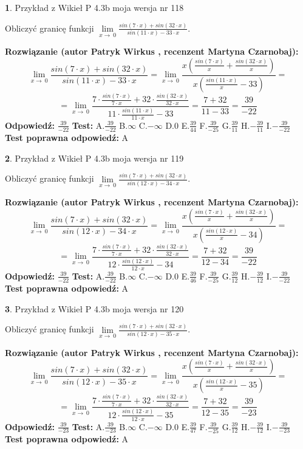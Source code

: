 \documentclass[12pt, a4paper]{article}
\theoremstyle{definition} %
\newtheorem{zad}{}
\newcommand{\zadStart}[1]{\begin{zad}#1\newline}
\newcommand{\zadStop}{\end{zad}}
\newcommand{\rozwStart}[2]{\noindent \textbf{Rozwiązanie (autor #1 , recenzent #2): }\newline}
\newcommand{\rozwStop}{\newline}
\newcommand{\odpStart}{\noindent \textbf{Odpowiedź:}\newline}
\newcommand{\odpStop}{\newline}
\newcommand{\testStart}{\noindent \textbf{Test:}\newline}
\newcommand{\testStop}{\newline}
\newcommand{\kluczStart}{\noindent \textbf{Test poprawna odpowiedź:}\newline}
\newcommand{\kluczStop}{\newline}
\begin{document}
\zadStart{Przykład z Wikieł P 4.3b moja wersja nr 118}


Obliczyć granicę funkcji $\lim\limits_{x\to\ 0}\frac{sin(7 \cdot x)+sin(32 \cdot x)}{sin(11 \cdot x)-33 \cdot x}$.
\zadStop
\rozwStart{Patryk Wirkus}{Martyna Czarnobaj}
$$\lim\limits_{x\to\ 0}\frac{sin(7 \cdot x)+sin(32 \cdot x)}{sin(11 \cdot x)-33 \cdot x}=\lim\limits_{x\to\ 0}\frac{x(\frac{sin(7 \cdot x)}{x}+\frac{sin(32 \cdot x)}{x})}{x(\frac{sin(11 \cdot x)}{x}-33)}=$$
$$=\lim\limits_{x\to\ 0}\frac{7 \cdot \frac{sin(7 \cdot x)}{7 \cdot x}+32 \cdot \frac{sin(32 \cdot x)}{32 \cdot x}}{11 \cdot \frac{sin(11 \cdot x)}{11 \cdot x}-33}=\frac{7+32}{11-33} = \frac{39}{-22}$$
\rozwStop
\odpStart
$\frac{39}{-22}$
\odpStop
\testStart
A.$\frac{39}{-22}$
B.$\infty$
C.$-\infty$
D.$0$
E.$\frac{39}{44}$
F.$\frac{39}{-25}$
G.$\frac{39}{11}$
H.$-\frac{39}{11}$
I.$-\frac{39}{-22}$
\testStop
\kluczStart
A
\kluczStop



\zadStart{Przykład z Wikieł P 4.3b moja wersja nr 119}


Obliczyć granicę funkcji $\lim\limits_{x\to\ 0}\frac{sin(7 \cdot x)+sin(32 \cdot x)}{sin(12 \cdot x)-34 \cdot x}$.
\zadStop
\rozwStart{Patryk Wirkus}{Martyna Czarnobaj}
$$\lim\limits_{x\to\ 0}\frac{sin(7 \cdot x)+sin(32 \cdot x)}{sin(12 \cdot x)-34 \cdot x}=\lim\limits_{x\to\ 0}\frac{x(\frac{sin(7 \cdot x)}{x}+\frac{sin(32 \cdot x)}{x})}{x(\frac{sin(12 \cdot x)}{x}-34)}=$$
$$=\lim\limits_{x\to\ 0}\frac{7 \cdot \frac{sin(7 \cdot x)}{7 \cdot x}+32 \cdot \frac{sin(32 \cdot x)}{32 \cdot x}}{12 \cdot \frac{sin(12 \cdot x)}{12 \cdot x}-34}=\frac{7+32}{12-34} = \frac{39}{-22}$$
\rozwStop
\odpStart
$\frac{39}{-22}$
\odpStop
\testStart
A.$\frac{39}{-22}$
B.$\infty$
C.$-\infty$
D.$0$
E.$\frac{39}{46}$
F.$\frac{39}{-25}$
G.$\frac{39}{12}$
H.$-\frac{39}{12}$
I.$-\frac{39}{-22}$
\testStop
\kluczStart
A
\kluczStop



\zadStart{Przykład z Wikieł P 4.3b moja wersja nr 120}


Obliczyć granicę funkcji $\lim\limits_{x\to\ 0}\frac{sin(7 \cdot x)+sin(32 \cdot x)}{sin(12 \cdot x)-35 \cdot x}$.
\zadStop
\rozwStart{Patryk Wirkus}{Martyna Czarnobaj}
$$\lim\limits_{x\to\ 0}\frac{sin(7 \cdot x)+sin(32 \cdot x)}{sin(12 \cdot x)-35 \cdot x}=\lim\limits_{x\to\ 0}\frac{x(\frac{sin(7 \cdot x)}{x}+\frac{sin(32 \cdot x)}{x})}{x(\frac{sin(12 \cdot x)}{x}-35)}=$$
$$=\lim\limits_{x\to\ 0}\frac{7 \cdot \frac{sin(7 \cdot x)}{7 \cdot x}+32 \cdot \frac{sin(32 \cdot x)}{32 \cdot x}}{12 \cdot \frac{sin(12 \cdot x)}{12 \cdot x}-35}=\frac{7+32}{12-35} = \frac{39}{-23}$$
\rozwStop
\odpStart
$\frac{39}{-23}$
\odpStop
\testStart
A.$\frac{39}{-23}$
B.$\infty$
C.$-\infty$
D.$0$
E.$\frac{39}{47}$
F.$\frac{39}{-25}$
G.$\frac{39}{12}$
H.$-\frac{39}{12}$
I.$-\frac{39}{-23}$
\testStop
\kluczStart
A
\kluczStop
\end{document}
